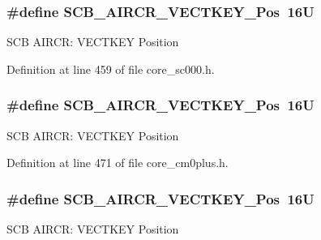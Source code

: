 \subsubsection[{\texorpdfstring{S\+C\+B\+\_\+\+A\+I\+R\+C\+R\+\_\+\+V\+E\+C\+T\+K\+E\+Y\+\_\+\+Pos}{SCB_AIRCR_VECTKEY_Pos}}]{\setlength{\rightskip}{0pt plus 5cm}\#define S\+C\+B\+\_\+\+A\+I\+R\+C\+R\+\_\+\+V\+E\+C\+T\+K\+E\+Y\+\_\+\+Pos~16U}\hypertarget{group___c_m_s_i_s___s_c_b_gaaa27c0ba600bf82c3da08c748845b640}{}\label{group___c_m_s_i_s___s_c_b_gaaa27c0ba600bf82c3da08c748845b640}
S\+CB A\+I\+R\+CR\+: V\+E\+C\+T\+K\+EY Position 

Definition at line 459 of file core\+\_\+sc000.\+h.

\subsubsection[{\texorpdfstring{S\+C\+B\+\_\+\+A\+I\+R\+C\+R\+\_\+\+V\+E\+C\+T\+K\+E\+Y\+\_\+\+Pos}{SCB_AIRCR_VECTKEY_Pos}}]{\setlength{\rightskip}{0pt plus 5cm}\#define S\+C\+B\+\_\+\+A\+I\+R\+C\+R\+\_\+\+V\+E\+C\+T\+K\+E\+Y\+\_\+\+Pos~16U}\hypertarget{group___c_m_s_i_s___s_c_b_gaaa27c0ba600bf82c3da08c748845b640}{}\label{group___c_m_s_i_s___s_c_b_gaaa27c0ba600bf82c3da08c748845b640}
S\+CB A\+I\+R\+CR\+: V\+E\+C\+T\+K\+EY Position 

Definition at line 471 of file core\+\_\+cm0plus.\+h.

\subsubsection[{\texorpdfstring{S\+C\+B\+\_\+\+A\+I\+R\+C\+R\+\_\+\+V\+E\+C\+T\+K\+E\+Y\+\_\+\+Pos}{SCB_AIRCR_VECTKEY_Pos}}]{\setlength{\rightskip}{0pt plus 5cm}\#define S\+C\+B\+\_\+\+A\+I\+R\+C\+R\+\_\+\+V\+E\+C\+T\+K\+E\+Y\+\_\+\+Pos~16U}\hypertarget{group___c_m_s_i_s___s_c_b_gaaa27c0ba600bf82c3da08c748845b640}{}\label{group___c_m_s_i_s___s_c_b_gaaa27c0ba600bf82c3da08c748845b640}
S\+CB A\+I\+R\+CR\+: V\+E\+C\+T\+K\+EY Position 

